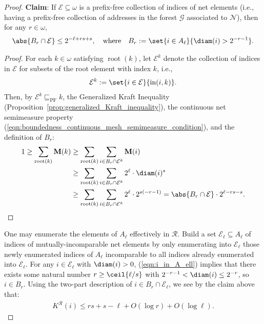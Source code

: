 \begin{proof}
    \noindent \textbf{Claim}: If $\mathcal{E} \subseteq \omega$ is a prefix-free collection of indices of net elements (i.e., having a prefix-free collection of addresses in the forest $\mathcal{G}$ associated to $\mathcal{N}$), then for any $r \in \omega$, 
    \begin{align*}
        \abs{B_r \cap \mathcal{E}} \leq 2^{-\ell + rs + s}, \quad \text{where} \quad B_r := \set{i \in A_\ell}{\diam(i) > 2^{- r - 1}}.
    \end{align*}
    \begin{proof}
        For each $k \in \omega$ satisfying $\operatorname{root}(k)$, let $\mathcal{E}^k$ denote the collection of indices in $\mathcal{E}$ for subsets of the root element with index $k$, i.e.,
        \begin{align*}
            \mathcal{E}^k := \set{i \in \mathcal{E}}{\operatorname{in}(i, k)}.
        \end{align*}
        Then, by $\mathcal{E}^k \sqsubseteq_{\operatorname{PF}} k$, the Generalized Kraft Inequality (Proposition~\ref{prop:generalized_Kraft_inequality}), the continuous net semimeasure property (\ref{eqn:boundedness_continuous_mesh_semimeasure_condition}), and the definition of $B_r$:
        \begin{align*}
            1 \geq \sum_{\operatorname{root}(k)} \mathbf{M}(k) &\geq \sum_{\operatorname{root}(k)} \sum_{i \in B_r \cap \mathcal{E}^k} \mathbf{M}(i)\\ 
            &\geq \sum_{\operatorname{root}(k)} \sum_{i \in B_r \cap \mathcal{E}^k} 2^{\ell} \cdot \diam(i)^s\\ 
            &\geq \sum_{\operatorname{root}(k)} \sum_{i \in B_r \cap \mathcal{E}^k} 2^{\ell} \cdot 2^{s(- r - 1)} = \abs{B_r \cap \mathcal{E}} \cdot 2^{\ell - rs - s}.
        \end{align*}
    \end{proof}
    One may enumerate the elements of $A_\ell$ effectively in $\mathscr{R}$. Build a set $\mathcal{E}_\ell \subseteq A_\ell$ of indices of mutually-incomparable net elements by only enumerating into $\mathcal{E}_\ell$ those newly enumerated indices of $A_\ell$ incomparable to all indices already enumerated into $\mathcal{E}_\ell$. For any $i \in \mathcal{E}_\ell$ with $\diam(i) > 0$, (\ref{eqn:i_in_A_ell}) implies that there exists some natural number $r \geq \ceil{\ell / s}$ with $2^{-r - 1} < \diam(i) \leq 2^{-r}$, so $i \in B_r$. Using the two-part description of $i \in B_r \cap \mathcal{E}_\ell$, we see by the claim above that:
    \begin{align*}
        K^{\mathscr{R}}(i) \leq r s + s - \ell + O(\log r) + O(\log \ell).
    \end{align*}


\end{proof}
